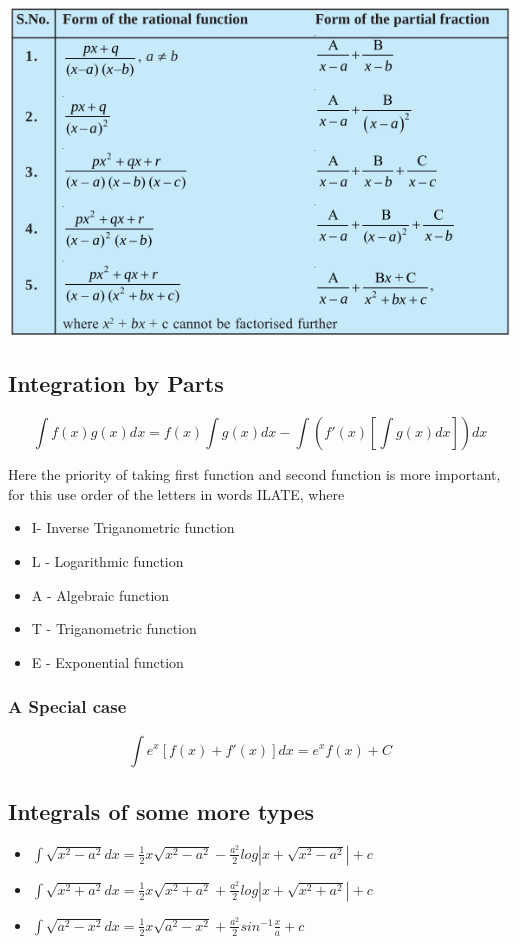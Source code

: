 \documentclass[12pt]{article}
\begin{document}
    \begin{center}
        \includegraphics*[scale= 0.5]{3.png}

        
    \end{center}

    \subsection*{Integration by Parts}
    $$\int f(x) g(x) dx = f(x) \int g(x) dx - \int \left( f'(x) \left[ \int g(x) dx \right] \right) dx $$

    Here the priority of taking first function and second function is more important, for this use order of the letters in words ILATE, where

    \begin{itemize}
        \item I- Inverse Triganometric function
        \item L - Logarithmic function 
        \item A - Algebraic function 
        \item T - Triganometric function 
        \item E - Exponential function 
    \end{itemize}
    \subsubsection*{A Special case}
    $$\int e^x [f(x)+f'(x)] dx = e^x f(x)+C$$


    \subsection*{Integrals of some more types}
    \begin{itemize}
        \item $\int \sqrt{x^2-a^2} dx =\frac{1}{2} x \sqrt{x^2-a^2} -\frac{a^2}{2} log|x+\sqrt{x^2-a^2}|+c$
        \item $\int \sqrt{x^2+a^2} dx =\frac{1}{2} x \sqrt{x^2+a^2} +\frac{a^2}{2} log|x+\sqrt{x^2+a^2}|+c$
        \item $\int \sqrt{a^2-x^2}dx = \frac{1}{2} x \sqrt{a^2-x^2}+\frac{a^2}{2}sin^{-1}\frac{x}{a}+c$

    \end{itemize}
\end{document}
